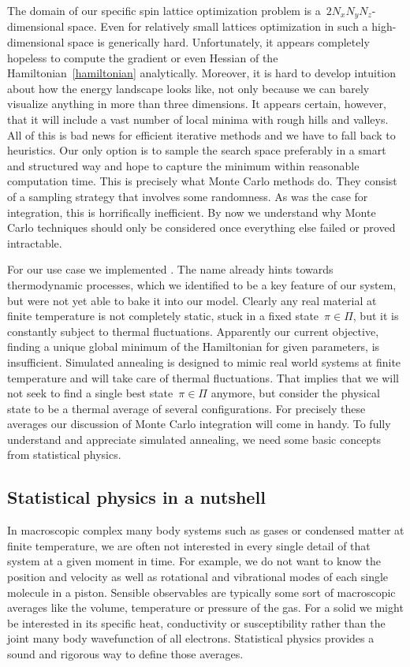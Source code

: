 The domain of our specific spin lattice optimization problem is a~$2 N_x N_y
N_z$-dimensional space.  Even for relatively small lattices optimization in such
a high-dimensional space is generically hard. Unfortunately, it appears
completely hopeless to compute the gradient or even Hessian of the
Hamiltonian~\eqref{hamiltonian} analytically. Moreover, it is hard to develop
intuition about how the energy landscape looks like, not only because we can
barely visualize anything in more than three dimensions. It appears certain,
however, that it will include a vast number of local minima with rough hills and
valleys. All of this is bad news for efficient iterative methods and we have to
fall back to heuristics. Our only option is to sample the search space
preferably in a smart and structured way and hope to capture the minimum within
reasonable computation time. This is precisely what Monte Carlo methods do. They
consist of a sampling strategy that involves some randomness. As was the case
for integration, this is horrifically inefficient. By now we understand why
Monte Carlo techniques should only be considered once everything else failed or
proved intractable.

For our use case we implemented . The name already
hints towards thermodynamic processes, which we identified to be a key
feature of our system, but were not yet able to bake it into our model. Clearly
any real material at finite temperature is not completely static, \ie{} stuck in
a fixed state~$\pi \in \Pi$, but it is constantly subject to thermal
fluctuations. Apparently our current objective, finding a unique global minimum
of the Hamiltonian for given parameters, is insufficient. Simulated annealing is
designed to mimic real world systems at finite temperature and will take care of
thermal fluctuations. That implies that we will not seek to find a single best
state~$\pi \in \Pi$ anymore, but consider the physical state to be a thermal
average of several configurations. For precisely these averages our discussion
of Monte Carlo integration will come in handy. To fully understand and
appreciate simulated annealing, we need some basic concepts from statistical
physics.

\subsection{Statistical physics in a nutshell}

In macroscopic complex many body systems such as gases or condensed matter at
finite temperature, we are often not interested in every single detail of that
system at a given moment in time.  For example, we do not want to know the
position and velocity as well as rotational and vibrational modes of each single
molecule in a piston. Sensible observables are typically some sort of
macroscopic averages like the volume, temperature or pressure of the gas. For a
solid we might be interested in its specific heat, conductivity or
susceptibility rather than the joint many body wavefunction of all electrons.
Statistical physics provides a sound and rigorous way to define those averages.

